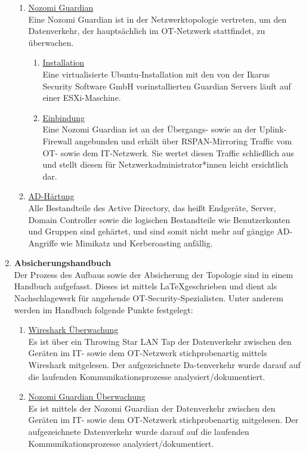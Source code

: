 \documentclass[
	headings=optiontotocandhead,%
	oneside,
	numbers=noenddot,%
	toc=flat, %
	10pt, %
	parskip=full, %
	listof=totoc, %
	listof=flat, %
	numbers=noenddot, %
	bibliography=totoc, %
	a4paper,DIV=14,
]{scrartcl}
\begin{document}
\begin{enumerate}[start=1,label={\bfseries Ziel-H \arabic*},leftmargin=*,wide]
\begin{enumerate}[label=\alph*.]
\item{\underline{Nozomi Guardian}}\\
Eine Nozomi Guardian ist in der Netzwerktopologie vertreten, um den Datenverkehr, der hauptsächlich im OT-Netzwerk stattfindet, zu überwachen.
\begin{enumerate}[label=\roman*.]
\item{\underline{Installation}}\\
Eine virtualisierte Ubuntu-Installation mit den von der Ikarus Security Software GmbH vorinstallierten Guardian Servers läuft auf einer ESXi-Maschine.

\item{\underline{Einbindung}}\\
Eine Nozomi Guardian ist an der Übergangs- sowie an der Uplink-Firewall angebunden und erhält über RSPAN-Mirroring Traffic vom OT- sowie dem IT-Netzwerk. Sie wertet diesen Traffic schließlich aus und stellt diesen für Netzwerkadministrator*innen leicht ersichtlich dar.
\end{enumerate}

\item{\underline{AD-Härtung}}\\
Alle Bestandteile des Active Directory, das heißt Endgeräte, Server, Domain Controller sowie die logischen Bestandteile wie Benutzerkonten und Gruppen sind gehärtet, und sind somit nicht mehr auf gängige AD-Angriffe wie Mimikatz und Kerberoasting anfällig.
\end{enumerate}

\item{\bfseries{Absicherungshandbuch}}\\
Der Prozess des Aufbaus sowie der Absicherung der Topologie sind in einem Handbuch aufgefasst. Dieses ist mittels \LaTeX geschrieben und dient als Nachschlagewerk für angehende OT-Security-Spezialisten. Unter anderem werden im Handbuch folgende Punkte festgelegt:
\begin{enumerate}[label=\alph*.]
\item{\underline{Wireshark Überwachung}}\\
Es ist über ein Throwing Star LAN Tap der Datenverkehr zwischen den Geräten im IT- sowie dem OT-Netzwerk stichprobenartig mittels Wireshark mitgelesen. Der aufgezeichnete Da-tenverkehr wurde darauf auf die laufenden Kommunikationsprozesse analysiert/dokumentiert.

\item{\underline{Nozomi Guardian Überwachung}}\\
Es ist mittels der Nozomi Guardian der Datenverkehr zwischen den Geräten im IT- sowie dem OT-Netzwerk stichprobenartig mitgelesen. Der aufgezeichnete Datenverkehr wurde darauf auf die laufenden Kommunikationsprozesse analysiert/dokumentiert.


\end{enumerate}
\end{enumerate}
\end{document}
